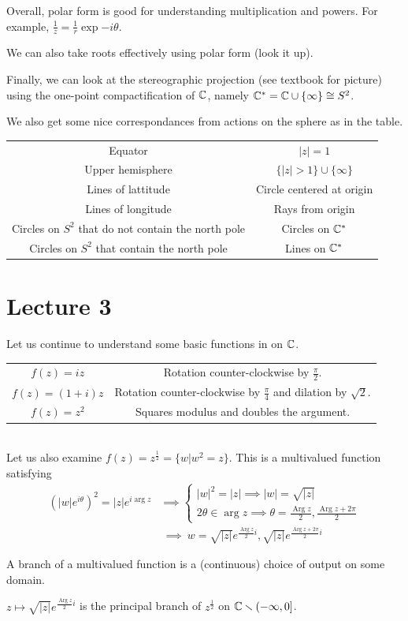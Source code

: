 \documentclass[11pt,leqno,oneside]{amsart}
\newcommand{\Arg}{\operatorname{Arg}}
\begin{document}
Overall, polar form is good for understanding multiplication and powers. For example, $\frac{1}{z} = \frac{1}{r} \exp{-i \theta}$.

We can also take roots effectively using polar form (look it up).

Finally, we can look at the stereographic projection (see textbook for picture) using the one-point compactification of ${\mathbb C}$, namely ${\mathbb C}^* = {\mathbb C} \cup \{\infty\} \cong S^2$.

We also get some nice correspondances from actions on the sphere as in the table. \\
    \begin{tabular}{|c|c|}
        \hline
        Equator & $|z| = 1$ \\
        Upper hemisphere & $\{|z| > 1\} \cup \{\infty\}$ \\
        Lines of lattitude & Circle centered at origin \\
        Lines of longitude & Rays from origin \\
        Circles on $S^2$ that do not contain the north pole & Circles on ${\mathbb C}^*$ \\
        Circles on $S^2$ that contain the north pole & Lines on ${\mathbb C}^*$ \\
        \hline
    \end{tabular}
\section{Lecture 3}

Let us continue to understand some basic functions in on ${\mathbb C}$. \\
\begin{tabular}{|c|c|}
    \hline
    $f(z) = iz$ & Rotation counter-clockwise by $\frac{\pi}{2}$. \\
    $f(z) = (1+i)z$ & Rotation counter-clockwise by $\frac{\pi}{4}$ and dilation by $\sqrt{2}$. \\
    $f(z) = z^2$ & Squares modulus and doubles the argument. \\
   \hline
\end{tabular} \\
Let us also examine $f(z) = z^{\frac{1}{2}} = \{w | w^2=z\}$. This is a multivalued function satisfying
\begin{align*}
    (|w|e^{i\theta})^2 = |z|e^{i \arg z} & \implies \begin{cases}
        |w|^2 = |z| \implies |w| = \sqrt{|z|} \\
        2\theta \in \arg z \implies \theta = \frac{\Arg z}{2}, \frac{\Arg z + 2\pi}{2}
    \end{cases} \\
    \ & \ \implies \ w = \sqrt{|z|}e^{\frac{\Arg z}{2}i}, \sqrt{|z|}e^{\frac{\Arg z + 2\pi}{2} i}
\end{align*}
\begin{defn}
    A branch of a multivalued function is a (continuous) choice of output on some domain.
\end{defn}
\begin{example}
    $z \mapsto \sqrt{|z|}e^{\frac{\Arg z}{2}i}$ is the principal branch of
    $z^{\frac{1}{2}}$ on ${\mathbb C} \smallsetminus (-\infty,0]$.
\end{example}
\end{document}
